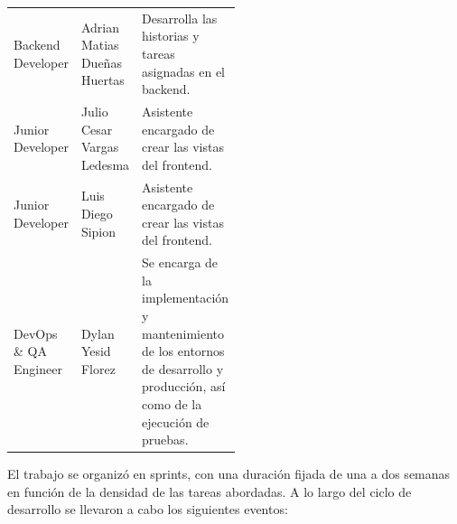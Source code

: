 \begin{minipage}{\linewidth}
\begin{tabularx}{\linewidth}{
        @{}
        >{\raggedright\arraybackslash}p{0.19\linewidth}
        >{\raggedright\arraybackslash}p{0.31\linewidth}
        >{\raggedright\arraybackslash}X
        @{}
    }
        Backend Developer &
        Adrian Matias Dueñas Huertas &
        Desarrolla las historias y tareas asignadas en el backend. \\

        Junior Developer &
        Julio Cesar Vargas Ledesma &
        Asistente encargado de crear las vistas del frontend. \\

        Junior Developer &
        Luis Diego Sipion &
        Asistente encargado de crear las vistas del frontend. \\

        DevOps \& QA Engineer &
        Dylan Yesid Florez &
        Se encarga de la implementación y mantenimiento de los entornos de desarrollo y producción, \newline
        así como de la ejecución de pruebas. \\

        \bottomrule
    \end{tabularx}
    \endgroup


\end{minipage}
\finBloqueAPA


El trabajo se organizó en sprints, con una duración fijada de una a dos semanas en función de la densidad de las tareas abordadas. 
A lo largo del ciclo de desarrollo se llevaron a cabo los siguientes eventos:

